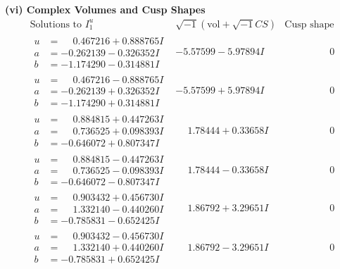 \documentclass[1p]{elsarticle_modified}
\theoremstyle{definition}
\newcommand{\I}{\sqrt{-1}}
\begin{document}
\newpage\flushleft \textbf{(vi) Complex Volumes and Cusp Shapes}
$$\begin{array}{c|c|c}  
\text{Solutions to }I^u_{1}& \I (\text{vol} + \sqrt{-1}CS) & \text{Cusp shape}\\
 \hline 
\begin{aligned}
u &= \phantom{-}0.467216 + 0.888765 I \\
a &= -0.262139 - 0.326352 I \\
b &= -1.174290 - 0.314881 I\end{aligned}
 & -5.57599 - 5.97894 I & \phantom{-0.000000 } 0 \\ \hline\begin{aligned}
u &= \phantom{-}0.467216 - 0.888765 I \\
a &= -0.262139 + 0.326352 I \\
b &= -1.174290 + 0.314881 I\end{aligned}
 & -5.57599 + 5.97894 I & \phantom{-0.000000 } 0 \\ \hline\begin{aligned}
u &= \phantom{-}0.884815 + 0.447263 I \\
a &= \phantom{-}0.736525 + 0.098393 I \\
b &= -0.646072 + 0.807347 I\end{aligned}
 & \phantom{-}1.78444 + 0.33658 I & \phantom{-0.000000 } 0 \\ \hline\begin{aligned}
u &= \phantom{-}0.884815 - 0.447263 I \\
a &= \phantom{-}0.736525 - 0.098393 I \\
b &= -0.646072 - 0.807347 I\end{aligned}
 & \phantom{-}1.78444 - 0.33658 I & \phantom{-0.000000 } 0 \\ \hline\begin{aligned}
u &= \phantom{-}0.903432 + 0.456730 I \\
a &= \phantom{-}1.332140 - 0.440260 I \\
b &= -0.785831 - 0.652425 I\end{aligned}
 & \phantom{-}1.86792 + 3.29651 I & \phantom{-0.000000 } 0 \\ \hline\begin{aligned}
u &= \phantom{-}0.903432 - 0.456730 I \\
a &= \phantom{-}1.332140 + 0.440260 I \\
b &= -0.785831 + 0.652425 I\end{aligned}
 & \phantom{-}1.86792 - 3.29651 I & \phantom{-0.000000 } 0 \\ \hline\begin{aligned}

\end{aligned}
\end{array}$$
\end{document}
